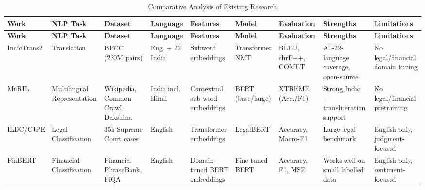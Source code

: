 \begin{landscape}
\renewcommand{\arraystretch}{1.3}
\footnotesize
\setlength{\tabcolsep}{4pt}

\footnotesize

\begin{longtable}{|
>{\RaggedRight\arraybackslash}p{1.9cm}|
>{\RaggedRight\arraybackslash}p{1.9cm}|
>{\RaggedRight\arraybackslash}p{2.7cm}|
>{\RaggedRight\arraybackslash}p{1.9cm}|
>{\RaggedRight\arraybackslash}p{2.1cm}|
>{\RaggedRight\arraybackslash}p{1.9cm}|
>{\RaggedRight\arraybackslash}p{1.9cm}|
>{\RaggedRight\arraybackslash}p{2.7cm}|
>{\RaggedRight\arraybackslash}p{2.7cm}|}

\caption{Comparative Analysis of Existing Research}
\label{tab:comparison}\\

\hline
\textbf{Work} &
\textbf{NLP Task} &
\textbf{Dataset} &
\textbf{Language} &
\textbf{Features} &
\textbf{Model} &
\textbf{Evaluation} &
\textbf{Strengths} &
\textbf{Limitations}\\
\hline
\endfirsthead

\hline
\textbf{Work} &
\textbf{NLP Task} &
\textbf{Dataset} &
\textbf{Language} &
\textbf{Features} &
\textbf{Model} &
\textbf{Evaluation} &
\textbf{Strengths} &
\textbf{Limitations}\\
\hline
\endhead

IndicTrans2 \cite{gala2023indictrans2}
&
Translation
&
BPCC (230M pairs)
&
Eng. + 22 Indic
&
Subword embeddings
&
Transformer NMT
&
BLEU, chrF++, COMET
&
All-22-language coverage, open-source
&
No legal/financial domain tuning
\\ \hline

MuRIL \cite{khanuja2021muril}
&
Multilingual Representation
&
Wikipedia, Common Crawl, Dakshina
&
17 Indic incl. Hindi
&
Contextual sub-word embeddings
&
BERT (base/large)
&
XTREME (Acc./F1)
&
Strong Indic + transliteration support
&
No legal/financial pretraining
\\ \hline

ILDC/CJPE \cite{malik2021ildc}
&
Legal Classification
&
35k Supreme Court cases
&
English
&
Transformer embeddings
&
LegalBERT
&
Accuracy, Macro-F1
&
Large legal benchmark
&
English-only, judgment-focused
\\ \hline

FinBERT \cite{araci2019finbert}
&
Financial Classification
&
Financial PhraseBank, FiQA
&
English
&
Domain-tuned BERT embeddings
&
Fine-tuned BERT
&
Accuracy, F1, MSE
&
Works well on small labelled data
&
English-only, sentiment-focused
\\ \hline


\end{longtable}
\end{landscape}
